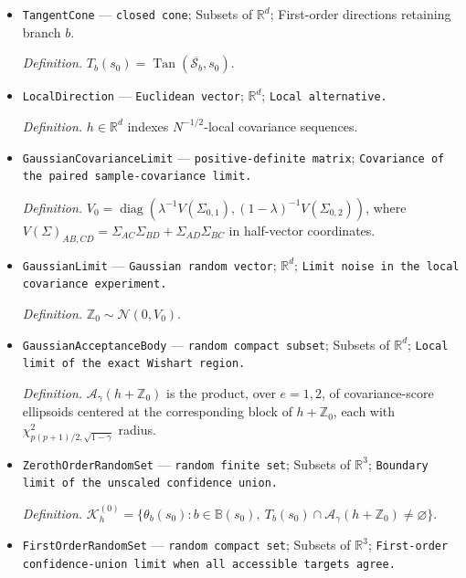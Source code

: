 \documentclass{article}
\begin{document}
\begin{itemize}
  \par\smallskip\noindent\emph{Definition.} \(\Gamma(s_0)=\{\theta_b(s_0):b\in\mathbb B(s_0)\}\), using the continuous branch extensions.
  \item \texttt{TangentCone} --- \texttt{closed cone}; Subsets of \(\mathbb R^d\); First-order directions retaining branch \(b\).
  \par\smallskip\noindent\emph{Definition.} \(T_b(s_0)=\operatorname{Tan}(\overline{\mathcal S_b},s_0)\).
  \item \texttt{LocalDirection} --- \texttt{Euclidean vector}; \(\mathbb R^d\); \texttt{Local alternative.}
  \par\smallskip\noindent\emph{Definition.} \(h\in\mathbb R^d\) indexes \(N^{-1/2}\)-local covariance sequences.
  \item \texttt{GaussianCovarianceLimit} --- \texttt{positive-\allowbreak{}definite matrix}; \texttt{Covariance of the paired sample-\allowbreak{}covariance limit.}
  \par\smallskip\noindent\emph{Definition.} \(V_0=\operatorname{diag}(\lambda^{-1}V(\Sigma_{0,1}),(1-\lambda)^{-1}V(\Sigma_{0,2}))\), where \(V(\Sigma)_{AB,CD}=\Sigma_{AC}\Sigma_{BD}+\Sigma_{AD}\Sigma_{BC}\) in half-vector coordinates.
  \item \texttt{GaussianLimit} --- \texttt{Gaussian random vector}; \(\mathbb R^d\); \texttt{Limit noise in the local covariance experiment.}
  \par\smallskip\noindent\emph{Definition.} \(\mathbb Z_0\sim\mathcal N(0,V_0)\).
  \item \texttt{GaussianAcceptanceBody} --- \texttt{random compact subset}; Subsets of \(\mathbb R^d\); \texttt{Local limit of the exact Wishart region.}
  \par\smallskip\noindent\emph{Definition.} \(\mathcal A_{\gamma}(h+\mathbb Z_0)\) is the product, over \(e=1,2\), of covariance-score ellipsoids centered at the corresponding block of \(h+\mathbb Z_0\), each with \(\chi^2_{p(p+1)/2,\sqrt{1-\gamma}}\) radius.
  \item \texttt{ZerothOrderRandomSet} --- \texttt{random finite set}; Subsets of \(\mathbb R^3\); \texttt{Boundary limit of the unscaled confidence union.}
  \par\smallskip\noindent\emph{Definition.} \(\mathcal K^{(0)}_h=\{\theta_b(s_0):b\in\mathbb B(s_0),\ T_b(s_0)\cap\mathcal A_{\gamma}(h+\mathbb Z_0)\neq\varnothing\}\).
  \item \texttt{FirstOrderRandomSet} --- \texttt{random compact set}; Subsets of \(\mathbb R^3\); \texttt{First-\allowbreak{}order confidence-\allowbreak{}union limit when all accessible targets agree.}

\end{itemize}
\end{document}
